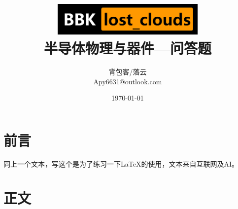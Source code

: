 \documentclass[UTF8]{ctexart}   %
\title{
    \includegraphics[width=7.91cm,height=1.64cm]{logo.png}
    \\
    \textbf{\CJKfamily{黑体}\fontsize{26pt}{39pt} 半导体物理与器件---问答题}
}
\author{                        %
    背包客/落云\\                %
    Apy6631@outlook.com         %
}
\date{\today}                   %
\begin{document}

\maketitle                      %

\thispagestyle{empty}           %


\clearpage                      %

\thispagestyle{empty}

\tableofcontents                %

\clearpage

\section{前言}                  %

\begin{center}
    同上一个文本，写这个是为了练习一下LaTeX的使用，文本来自互联网及AI。
\end{center}

\setcounter{page}{1}            %

\clearpage                      %

\section{正文}
\end{document}
